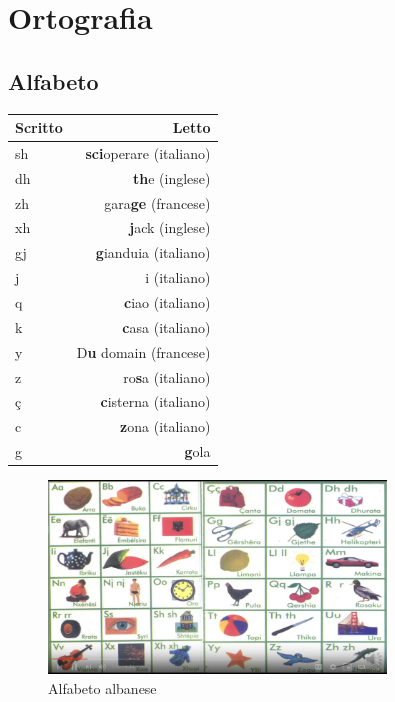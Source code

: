 
\chapter{Ortografia}

\section{Alfabeto}

\begin{table}[ht]
    \centering
    \begin{tabular}{lr}
        \toprule
        Scritto     &   Letto \\
        \midrule
        sh          &   \textbf{sci}operare (italiano)\\
        dh          &   \textbf{th}e (inglese) \\
        zh          &   gara\textbf{ge} (francese)\\
        xh          &   \textbf{j}ack (inglese) \\
        gj          &   \textbf{g}ianduia (italiano)\\
        j           &   i (italiano)\\
        q           &   \textbf{c}iao (italiano)\\
        k           &   \textbf{c}asa (italiano)\\ 
        y           &   D\textbf{u} domain (francese)\\
        z           &   ro\textbf{s}a (italiano) \\
        ç           &   \textbf{c}isterna (italiano) \\
        c           &   \textbf{z}ona (italiano) \\
        g           &   \textbf{g}ola \\
        \bottomrule
    \end{tabular}
\end{table}


\begin{figure}[ht]
    \centering
    \includegraphics[width=0.8\textwidth]{src/images/alfabetoAlbanese.PNG}
    \caption{Alfabeto albanese}
\end{figure}

